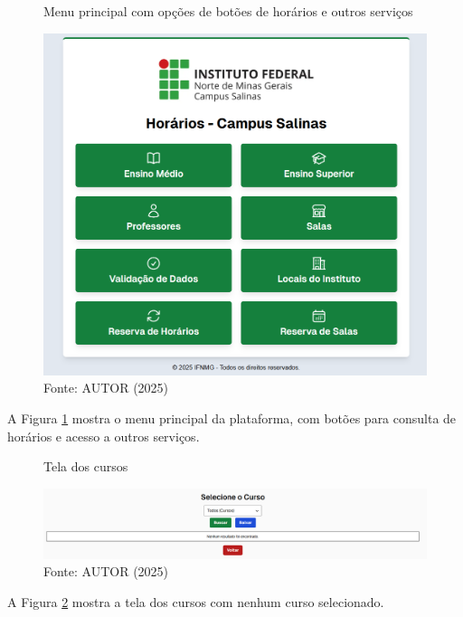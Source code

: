 \begin{figure}[htb]
    \centering
    \caption{Menu principal com opções de botões de horários e outros serviços}
    \includegraphics[width=1\textwidth]{Figuras/front-1.png}
    \caption*{Fonte: AUTOR (2025)}
    \label{fig_front_1}
\end{figure}

A Figura \ref{fig_front_1} mostra o menu principal da plataforma, com botões para consulta de horários e acesso a outros serviços.

\begin{figure}[htb]
    \centering
    \caption{Tela dos cursos}
    \includegraphics[width=1\textwidth]{Figuras/front-2.png}
    \caption*{Fonte: AUTOR (2025)}
    \label{fig_front_2}
\end{figure}

A Figura \ref{fig_front_2} mostra a tela dos cursos com nenhum curso selecionado.

